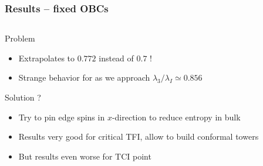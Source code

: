 \documentclass[10pt]{beamer}
\begin{document}
\begin{frame}
    \frametitle{Results -- fixed OBCs}

    \begin{columns}
        \begin{column}{0.4\linewidth}
            \begin{block}{Problem}
                \begin{itemize}
                    \item Extrapolates to $0.772$ instead of $0.7$ !
                    \pause
                    \item Strange behavior for as we approach $\lambda_3/\lambda_I \simeq 0.856$
                \end{itemize}
            \end{block}

            \pause
            \begin{block}{Solution ?}
                \begin{itemize}
                    \item Try to pin edge spins in $x$-direction to reduce entropy in bulk
                    \pause
                    \item Results very good for critical TFI, allow to build conformal towers
                    \pause
                    \item But results even worse for TCI point
                \end{itemize}
            \end{block}
        \end{column}        


\end{columns}
\end{frame}
\end{document}
